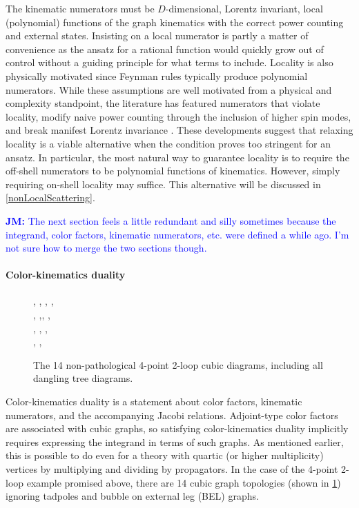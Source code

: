 \documentclass[11pt,letter]{article}
\newcommand{\jm}[1]{\textcolor{blue}{\textbf{JM: }{#1}}}
\begin{document}
The kinematic numerators must be $D$-dimensional, Lorentz invariant,
local (polynomial) functions of the graph kinematics with the correct
power counting and external states.
Insisting on a local numerator is
partly a matter of convenience as the ansatz for a rational function
would quickly grow out of control without a guiding principle for what
terms to include.  Locality is also physically motivated since Feynman
rules typically produce polynomial numerators.  While these
assumptions are well motivated from a physical and complexity
standpoint, the literature has featured numerators that violate
locality, modify naive power counting through the inclusion of higher
spin modes, and break manifest Lorentz invariance \cite{Square,
  WeinzierlBCJLagrangian, Mogull:2015adi, FivePointN4BCJ,
  Johansson:2017bfl, Ben-Shahar:2022ixa, Cheung:2016prv,
  Cheung:2021zvb}.  These developments suggest that relaxing locality
is a viable alternative when the condition proves too stringent for an
ansatz.
In particular, the most natural way to guarantee locality is to require the off-shell numerators to be polynomial functions of kinematics.
However, simply requiring on-shell locality may suffice.
This alternative will be discussed in \cref{nonLocalScattering}.

\jm{The next section feels a little redundant and silly sometimes
  because the integrand, color factors, kinematic numerators,
  etc. were defined a while ago.  I'm not sure how to merge the two
  sections though.}



\paragraph{Color-kinematics duality}
\begin{figure}
\centering
{\MCutC, \MCutD, \sumoCut, \MCutJ,  
 \\
  \doubleBoxCut,  \crossBoxCut,\pentaTriangleCut,  \MCutF, 
\\
\MCutI,  \MCutE, \MCutK, 
\\
 \MCutL, \MCutG,  \MCutH
}
\caption{The 14 non-pathological 4-point 2-loop cubic diagrams,
  including all dangling tree diagrams.} \label{fig:MaxCuts}
  \end{figure}

Color-kinematics duality is a statement about color factors, kinematic
numerators, and the accompanying Jacobi relations.  Adjoint-type color
factors are associated with cubic graphs, so satisfying
color-kinematics duality implicitly requires expressing the integrand
in terms of such graphs. As mentioned earlier, this is possible to do
even for a theory with quartic (or higher multiplicity) vertices by
multiplying and dividing by propagators.  In the case of the 4-point
2-loop example promised above, there are 14 cubic graph topologies
(shown in \cref{fig:MaxCuts}) ignoring tadpoles and bubble on external
leg (BEL) graphs.
\end{document}
